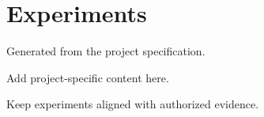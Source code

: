 \section{Experiments}
Generated from the project specification.

Add project-specific content here.

Keep experiments aligned with authorized evidence.
